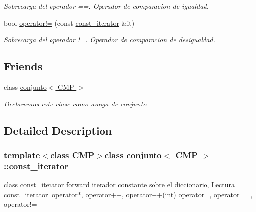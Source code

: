 \begin{DoxyCompactItemize}
\begin{DoxyCompactList}\small\item\em Sobrecarga del operador ==. Operador de comparacion de igualdad. \end{DoxyCompactList}\item 
bool \hyperlink{classconjunto_1_1const__iterator_a433c34257914c399d1eff2a1c9b1030d}{operator!=} (const \hyperlink{classconjunto_1_1const__iterator}{const\-\_\-iterator} \&it)
\begin{DoxyCompactList}\small\item\em Sobrecarga del operador !=. Operador de comparacion de desigualdad. \end{DoxyCompactList}\end{DoxyCompactItemize}
\subsection*{Friends}
\begin{DoxyCompactItemize}
\item 
\hypertarget{classconjunto_1_1const__iterator_a447db18bedcb8f88250a3d1789570e0a}{class \hyperlink{classconjunto_1_1const__iterator_a447db18bedcb8f88250a3d1789570e0a}{conjunto$<$ C\-M\-P $>$}}\label{classconjunto_1_1const__iterator_a447db18bedcb8f88250a3d1789570e0a}

\begin{DoxyCompactList}\small\item\em Declaramos esta clase como amiga de conjunto. \end{DoxyCompactList}\end{DoxyCompactItemize}


\subsection{Detailed Description}
\subsubsection*{template$<$class C\-M\-P$>$class conjunto$<$ C\-M\-P $>$\-::const\-\_\-iterator}

class \hyperlink{classconjunto_1_1const__iterator}{const\-\_\-iterator} forward iterador constante sobre el diccionario, Lectura \hyperlink{classconjunto_1_1const__iterator}{const\-\_\-iterator} ,operator$\ast$, operator++, \hyperlink{classconjunto_1_1const__iterator_a9ab281204402103f6d674986eb63f80d}{operator++(int)} operator=, operator==, operator!= 

